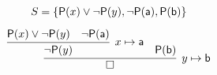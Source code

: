 
	\vspace{-1.5em}
\begin{gather*}
	S = 
	\{ 
	\mP(x) \lor \lnot\mP(y), 
	\lnot \mP(\ma), 
	\mP(\mb) 
	\}\\[0.5em]
\infer[y\mapsto\mb]{\emptyclause}{
\infer[x\mapsto\ma]{\lnot\mP(y)}{\mP(x)\lor \lnot \mP(y) & \lnot\mP(\ma)} & \mP(\mb)
	}
			\end{gather*}